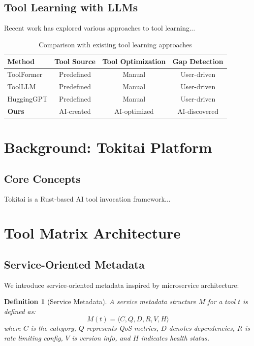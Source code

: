 \documentclass[11pt]{article}
\newcommand{\toolformer}{ToolFormer\xspace}
\newcommand{\toolllm}{ToolLLM\xspace}
\newtheorem{definition}{Definition}
\begin{document}
\subsection{Tool Learning with LLMs}

Recent work has explored various approaches to tool learning...

\begin{table}[t]
\centering
\caption{Comparison with existing tool learning approaches}
\label{tab:comparison}
\begin{tabular}{lccc}
\toprule
\textbf{Method} & \textbf{Tool Source} & \textbf{Tool Optimization} & \textbf{Gap Detection} \\
\midrule
\toolformer & Predefined & Manual & User-driven \\
\toolllm & Predefined & Manual & User-driven \\
HuggingGPT & Predefined & Manual & User-driven \\
\midrule
\textbf{Ours} & AI-created & AI-optimized & AI-discovered \\
\bottomrule
\end{tabular}
\end{table}

\section{Background: Tokitai Platform}\label{sec:background}

\subsection{Core Concepts}

Tokitai is a Rust-based AI tool invocation framework...

\section{Tool Matrix Architecture}\label{sec:architecture}

\subsection{Service-Oriented Metadata}

We introduce service-oriented metadata inspired by microservice architecture:

\begin{definition}[Service Metadata]
A service metadata structure $M$ for a tool $t$ is defined as:
\begin{equation}
M(t) = \langle C, Q, D, R, V, H \rangle
\end{equation}
where $C$ is the category, $Q$ represents QoS metrics, $D$ denotes dependencies, $R$ is rate limiting config, $V$ is version info, and $H$ indicates health status.
\end{definition}
\end{document}
